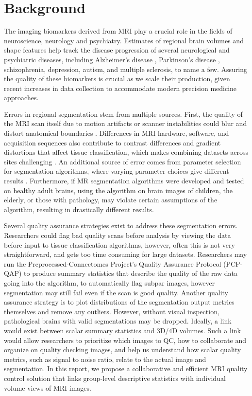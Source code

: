 \section{Background}


The imaging biomarkers derived from MRI play a crucial role in the fields of neuroscience, neurology and psychiatry. Estimates of regional brain volumes and shape features help track the disease progression of several neurological and psychiatric diseases, including Alzheimer's disease \cite{18632739,Vemuri_2010}, Parkinson's disease \cite{Silvia_Mangia_2013}, schizophrenia\cite{shenton2001review}, depression\cite{meisenzahl2011structural}, autism\cite{brambilla2003brain}, and multiple sclerosis\cite{Filippi_1995}, to name a few. Assuring the quality of these biomarkers is crucial as we scale their production, given recent increases in data collection to accommodate modern precision medicine approaches. 

Errors in regional segmentation stem from multiple sources. First, the quality of the MRI scan itself due to motion artifacts or scanner instabilities could blur and distort anatomical boundaries \cite{Blumenthal_2002}. Differences in MRI hardware, software, and acquisition sequences also contribute to contrast differences and gradient distortions that affect tissue classification, which makes combining datasets across sites challenging \cite{keshavan2016power}. An additional source of error comes from parameter selection for segmentation algorithms, where varying parameter choices give different results \cite{Han_2006}. Furthermore, if MR segmentation algorithms were developed and tested on healthy adult brains, using the algorithm on brain images of children, the elderly, or those with pathology, may violate certain assumptions of the algorithm, resulting in drastically different results. 

Several quality assurance strategies exist to address these segmentation errors. Researchers could flag bad quality scans before analysis by viewing the data before input to tissue classification algorithms, however, often this is not very straightforward, and gets too time consuming for large datasets. Researchers may run the Preprocessed-Connectomes Project’s Quality Assurance Protocol (PCP-QAP)\cite{shehzadpreprocessed} to produce summary statistics that describe the quality of the raw data going into the algorithm, to automatically flag subpar images, however segmentation may still fail even if the scan is good quality. Another quality assurance strategy is to plot distributions of the segmentation output metrics themselves and remove any outliers. However, without visual inspection, pathological brains with valid segmentations may be dropped. Ideally, a link would exist between scalar summary statistics and 3D/4D volumes. Such a link would allow researchers to prioritize which images to QC, how to collaborate and organize on quality checking images, and help us understand how scalar quality metrics, such as signal to noise ratio, relate to the actual image and segmentation. In this report, we propose a collaborative and efficient MRI quality control solution that links group-level descriptive statistics with individual volume views of MRI images.  


